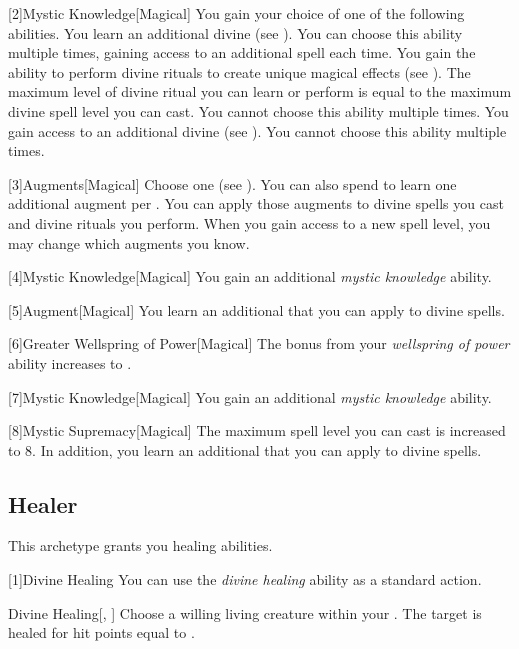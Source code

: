         [2]{Mystic Knowledge}[Magical]
        You gain your choice of one of the following abilities.
        {
             You learn an additional divine  (see ).
                You can choose this ability multiple times, gaining access to an additional spell each time.
             You gain the ability to perform divine rituals to create unique magical effects (see ).
                The maximum level of divine ritual you can learn or perform is equal to the maximum divine spell level you can cast.
                You cannot choose this ability multiple times.
             You gain access to an additional divine  (see ).
                You cannot choose this ability multiple times.
        }

        [3]{Augments}[Magical]
        Choose one  (see ).
        You can also spend  to learn one additional augment per .
        You can apply those augments to divine spells you cast and divine rituals you perform.
        When you gain access to a new spell level, you may change which augments you know.

        [4]{Mystic Knowledge}[Magical]
        You gain an additional \textit{mystic knowledge} ability.

        [5]{Augment}[Magical]
        You learn an additional  that you can apply to divine spells.

        [6]{Greater Wellspring of Power}[Magical]
        The bonus from your \textit{wellspring of power} ability increases to .

        [7]{Mystic Knowledge}[Magical]
        You gain an additional \textit{mystic knowledge} ability.

        [8]{Mystic Supremacy}[Magical]
        The maximum spell level you can cast is increased to 8.
        In addition, you learn an additional  that you can apply to divine spells.

    \subsection{Healer}
        This archetype grants you healing abilities.

        [1]{Divine Healing} You can use the \textit{divine healing} ability as a standard action.
        \begin{freeability}{Divine Healing}[, ]
            Choose a willing living creature within your .
            The target is healed for hit points equal to .
        \end{freeability}

